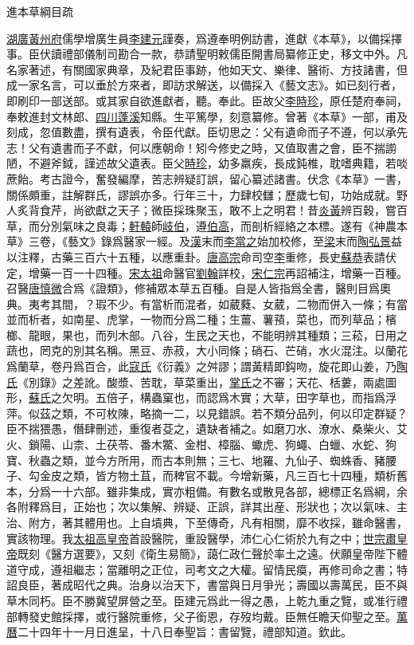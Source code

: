 
進本草綱目疏

\ul{湖廣}\ul{黃州府}儒學增廣生員\ul{李建元}謹奏，爲遵奉明例訪書，進獻《本草》，以備採擇事。臣伏讀禮部儀制司勘合一款，恭請聖明敕儒臣開書局纂修正史，移文中外。凡名家著述，有關國家典章，及紀君臣事跡，他如天文、樂律、醫術、方技諸書，但成一家名言，可以垂於方來者，即訪求解送，以備採入《藝文志》。如已刻行者，即刷印一部送部。或其家自欲進獻者，聽。奉此。臣故父\ul{李時珍}，原任楚府奉祠，奉敕進封文林郎、\ul{四川}\ul{蓬溪}知縣。生平篤學，刻意纂修。曾著《本草》一部，甫及刻成，忽值數盡，撰有遺表，令臣代獻。臣切思之：父有遺命而子不遵，何以承先志！父有遺書而子不獻，何以應朝命！矧今修史之時，又值取書之會，臣不揣謭陋，不避斧鉞，謹述故父遺表。臣父\ul{時珍}，幼多羸疾，長成鈍椎，耽嗜典籍，若啖蔗飴。考古證今，奮發編摩，苦志辨疑訂誤，留心纂述諸書。伏念《本草》一書，關係頗重，註解群氏，謬誤亦多。行年三十，力肆校讎；歷歲七旬，功始成就。野人炙背食芹，尚欲獻之天子；微臣採珠聚玉，敢不上之明君！昔\ul{炎}\ul{黃}辨百穀，嘗百草，而分別氣味之良毒；\ul{軒轅}師\ul{岐伯}，遵\ul{伯高}，而剖析經絡之本標。遂有《神農本草》三卷，《藝文》錄爲醫家一經。及\ul{漢}末而\ul{李當之}始加校修，至\ul{梁}末而\ul{陶弘景}益以注釋，古藥三百六十五種，以應重卦。\ul{唐高宗}命司空\ul{李}重修，長史\ul{蘇恭}表請伏定，增藥一百一十四種。\ul{宋太祖}命醫官\ul{劉翰}詳校，\ul{宋仁宗}再詔補注，增藥一百種。召醫\ul{唐慎微}合爲《證類》，修補眾本草五百種。自是人皆指爲全書，醫則目爲奧典。夷考其間，？瑕不少。有當析而混者，如葳蕤、女葳，二物而併入一條；有當並而析者，如南星、虎掌，一物而分爲二種；生薑、薯蕷，菜也，而列草品；檳榔、龍眼，果也，而列木部。八谷，生民之天也，不能明辨其種類；三菘，日用之蔬也，罔克的別其名稱。黑豆、赤菽，大小同條；硝石、芒硝，水火混注。以蘭花爲蘭草，卷丹爲百合，此\ul{寇氏}《衍義》之舛謬；謂黃精即鈎吻，旋花即山姜，乃\ul{陶氏}《別錄》之差訛。酸漿、苦耽，草菜重出，\ul{掌氏}之不審；天花、栝蔞，兩處圖形，\ul{蘇氏}之欠明。五倍子，構蟲窠也，而認爲木實；大草，田字草也，而指爲浮萍。似茲之類，不可枚陳，略摘一二，以見錯誤。若不類分品列，何以印定群疑？臣不揣猥愚，僭肆刪述，重復者芟之，遺缺者補之。如磨刀水、潦水、桑柴火、艾火、鎖陽、山柰、土茯苓、番木鱉、金柑、樟腦、蠍虎、狗蠅、白蠟、水蛇、狗寶、秋蟲之類，並今方所用，而古本則無；三七、地羅、九仙子、蜘蛛香、豬腰子、勾金皮之類，皆方物土苴，而稗官不載。今增新藥，凡三百七十四種，類析舊本，分爲一十六部。雖非集成，實亦粗備。有數名或散見各部，總標正名爲綱，余各附釋爲目，正始也；次以集解、辨疑、正誤，詳其出産、形狀也；次以氣味、主治、附方，著其體用也。上自墳典，下至傳奇，凡有相關，靡不收採，雖命醫書，實該物理。我\ul{太祖高皇帝}首設醫院，重設醫學，沛仁心仁術於九有之中；\ul{世宗肅皇帝}既刻《醫方選要》，又刻《衛生易簡》，藹仁政仁聲於率土之遠。伏願皇帝陛下體道守成，遵祖繼志；當離明之正位，司考文之大權。留情民瘼，再修司命之書；特詔良臣，著成昭代之典。治身以治天下，書當與日月爭光；壽國以壽萬民，臣不與草木同朽。臣不勝冀望屏營之至。臣建元爲此一得之愚，上乾九重之覽，或准行禮部轉發史館採擇，或行醫院重修，父子銜恩，存歿均戴。臣無任瞻天仰聖之至。\ul{萬曆}二十四年十一月日進呈，十八日奉聖旨：書留覽，禮部知道。欽此。